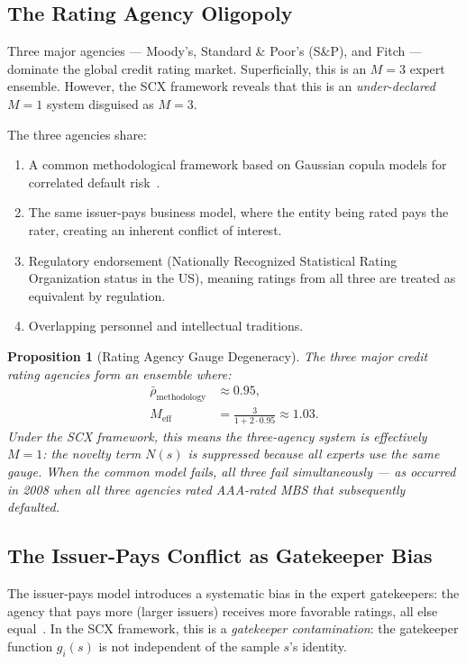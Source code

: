 \documentclass[12pt,a4paper]{article}
\newtheorem{proposition}[theorem]{Proposition}
\theoremstyle{remark}
\begin{document}
\subsection{The Rating Agency Oligopoly}

Three major agencies --- Moody's, Standard \& Poor's (S\&P), and Fitch ---
dominate the global credit rating market. Superficially, this is an $M=3$
expert ensemble. However, the SCX framework reveals that this is an
\emph{under-declared} $M=1$ system disguised as $M=3$.

The three agencies share:
\begin{enumerate}
\item A common methodological framework based on Gaussian copula models for
correlated default risk~\cite{li2000default}.
\item The same issuer-pays business model, where the entity being rated pays
the rater, creating an inherent conflict of interest.
\item Regulatory endorsement (Nationally Recognized Statistical Rating
Organization status in the US), meaning ratings from all three are treated
as equivalent by regulation.
\item Overlapping personnel and intellectual traditions.
\end{enumerate}

\begin{proposition}[Rating Agency Gauge Degeneracy]
The three major credit rating agencies form an ensemble where:
\begin{align}
\bar{\rho}_{\text{methodology}} &\approx 0.95, \\
M_{\text{eff}} &= \frac{3}{1 + 2 \cdot 0.95} \approx 1.03.
\label{eq:rating_meff}
\end{align}
Under the SCX framework, this means the three-agency system is effectively
$M=1$: the novelty term $N(s)$ is suppressed because all experts use the same
gauge. When the common model fails, all three fail simultaneously --- as
occurred in 2008 when all three agencies rated AAA-rated MBS that subsequently
defaulted.
\end{proposition}

\subsection{The Issuer-Pays Conflict as Gatekeeper Bias}

The issuer-pays model introduces a systematic bias in the expert gatekeepers:
the agency that pays more (larger issuers) receives more favorable ratings,
all else equal~\cite{bolton2012credit}. In the SCX framework, this is a
\emph{gatekeeper contamination}: the gatekeeper function $g_i(s)$ is not
independent of the sample $s$'s identity.
\end{document}
